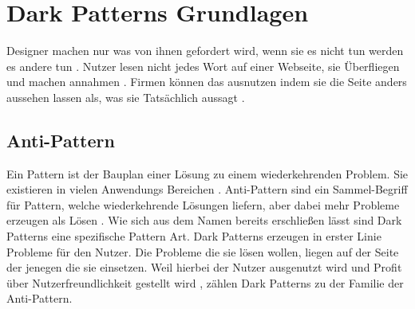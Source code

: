 \documentclass[conference,compsoc,final,a4paper]{IEEEtran}
\begin{document}
\newpage
\section{Dark Patterns Grundlagen}
Designer machen nur was von ihnen gefordert wird, wenn sie es nicht tun werden es andere tun \autocite{Nerdwriter1_YT_2018}. Nutzer lesen nicht jedes Wort auf einer Webseite, sie Überfliegen und machen annahmen \autocite{Brignull}. Firmen können das ausnutzen indem sie die Seite anders aussehen lassen als, was sie Tatsächlich aussagt \autocite{Brignull}.
\subsection{Anti-Pattern}
Ein Pattern ist der Bauplan einer Lösung zu einem wiederkehrenden Problem. Sie existieren in vielen Anwendungs Bereichen \autocite[S. 1-22]{MacDonald2019}. Anti-Pattern sind ein Sammel-Begriff für Pattern, welche wiederkehrende Lösungen liefern, aber dabei mehr Probleme erzeugen als Lösen \autocite[S. 193-222]{MacDonald2019}. Wie sich aus dem Namen bereits erschließen lässt sind Dark Patterns eine spezifische Pattern Art. Dark Patterns erzeugen in erster Linie Probleme für den Nutzer. Die Probleme die sie lösen wollen, liegen auf der Seite der jenegen die sie einsetzen. Weil hierbei der Nutzer ausgenutzt wird und Profit über Nutzerfreundlichkeit gestellt wird \autocite{Chivukula_2019}, zählen Dark Patterns zu der Familie der Anti-Pattern.
\end{document}
